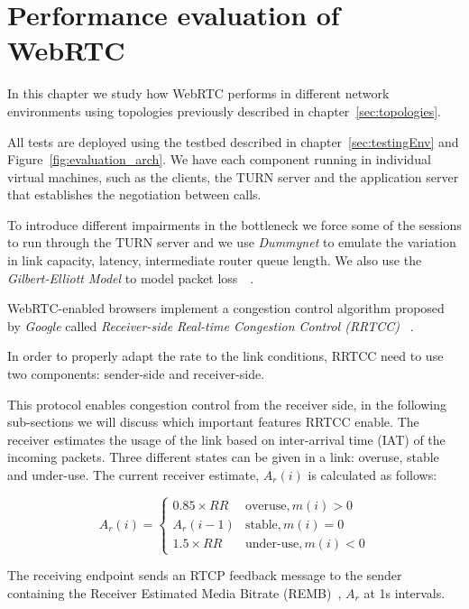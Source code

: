 \section{Performance evaluation of WebRTC}
\label{sec:tests}

\thispagestyle{empty}

In this chapter we study how WebRTC performs in different network environments using topologies previously described in chapter~\ref{sec:topologies}. 

All tests are deployed using the testbed described in chapter~\ref{sec:testingEnv} and Figure~\ref{fig:evaluation_arch}. We have each component running in individual virtual machines, such as the clients, the TURN server and the application server that establishes the negotiation between calls.

To introduce different impairments in the bottleneck we force some of the sessions to run through the TURN server and we use {\it Dummynet} to emulate the variation in link capacity, latency, intermediate router queue length. We also use the {\it Gilbert-Elliott Model} to model packet loss~\cite{gilbert1}~\cite{elliott1}.

WebRTC-enabled browsers implement a congestion control algorithm proposed by {\it Google} called {\it Receiver-side Real-time Congestion Control (RRTCC)} ~\cite{alvestrandCongestion2012}.

In order to properly adapt the rate to the link conditions, RRTCC need to use two components: sender-side and receiver-side.

This protocol enables congestion control from the receiver side, in the following sub-sections we will discuss which important features RRTCC enable. The receiver estimates the usage of the link based on inter-arrival time (IAT) of the incoming packets. Three different states can be given in a link: overuse, stable and under-use. The current receiver estimate, $A_r(i)$ is calculated as follows:

\begin{equation}
 A_r(i) =
  \begin{cases}
   0.85 \times RR & \text{overuse}, m(i)>0\\
   A_r(i-1) & \text{stable}, m(i)=0 \\
   1.5 \times RR & \text{under-use}, m(i)<0
  \end{cases}
\end{equation}

The receiving endpoint sends an RTCP feedback message to the sender containing the Receiver Estimated Media Bitrate (REMB)~\cite{alvestrandCongestionREMB}, $A_r$ at 1s intervals.

